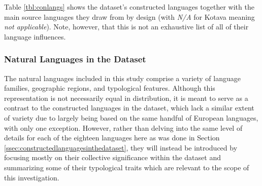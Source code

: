 \documentclass[12pt,a4paper]{article}
\numberwithin{figure}{section}
\numberwithin{table}{section}
\numberwithin{definition}{section}
\begin{document}
Table \ref{tbl:conlangs} shows the dataset's constructed languages together with the main source languages they draw from by design (with \textit{N/A} for Kotava meaning \textit{not applicable}). Note, however, that this is not an exhaustive list of all of their language influences. 




\subsubsection{Natural Languages in the Dataset}
\label{ssec:naturallanguagesinthedataset}

The natural languages included in this study comprise a variety of language families, geographic regions, and typological features. Although this representation is not necessarily equal in distribution, it is meant to serve as a contrast to the constructed languages in the dataset, which lack a similar extent of variety due to largely being based on the same handful of European languages, with only one exception. However, rather than delving into the same level of details for each of the eighteen languages here as was done in Section \ref{ssec:constructedlanguagesinthedataset}, they will instead be introduced by focusing mostly on their collective significance within the dataset and summarizing some of their typological traits which are relevant to the scope of this investigation.
\end{document}
